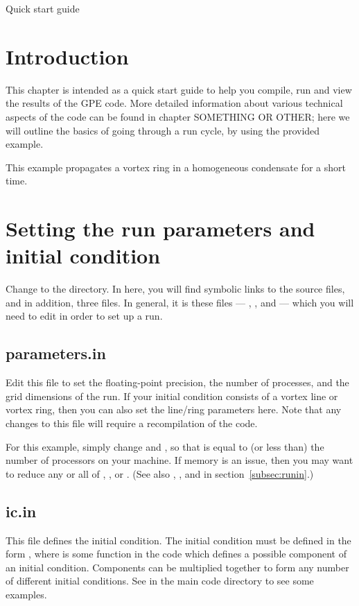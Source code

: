 
\begin{chapter}{\label{cha:quickstart} Quick start guide}
  \section{Introduction}
  This chapter is intended as a quick start guide to help you compile, run and
  view the results of the GPE code.  More detailed information about various
  technical aspects of the code can be found in chapter SOMETHING OR OTHER;
  here we will outline the basics of going through a run cycle, by using the
  provided  example.

  This example propagates a vortex ring in a homogeneous condensate for a short
  time.

  \section{Setting the run parameters and initial condition}
  Change to the  directory.  In here, you
  will find symbolic links to the source files, and in addition, three
   files.  In general, it is these files ---
  , , and  --- which you
  will need to edit in order to set up a run.

  \subsection{parameters.in}
  Edit this file to set the floating-point precision, the number of processes,
  and the grid dimensions of the run.  If your initial condition consists of a
  vortex line or vortex ring, then you can also set the line/ring parameters
  here.  Note that any changes to this file will require a recompilation of the
  code.

  For this example, simply change  and , so
  that  is equal to (or less than) the number of
  processors on your machine.  If memory is an issue, then you may want to
  reduce any or all of , , or .  (See also
  , , and  in section~\ref{subsec:runin}.)

  \subsection{ic.in}
  This file defines the initial condition.  The initial condition must be
  defined in the form , where
   is some function in the code which defines a possible
  component of an initial condition.  Components can be multiplied together to
  form any number of different initial conditions.  See  in the
  main code directory to see some examples.


\end{chapter}
